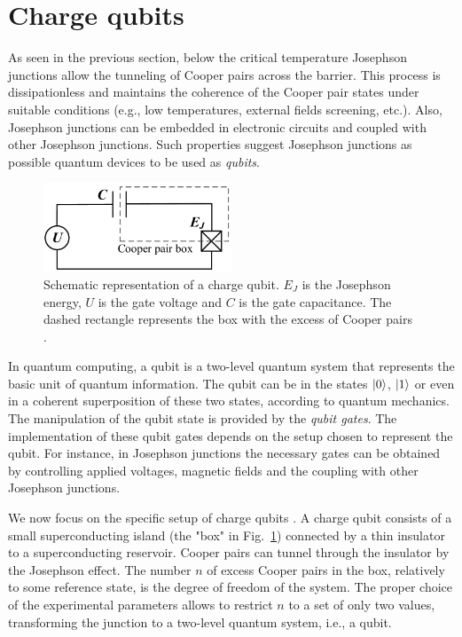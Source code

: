 \documentclass[../main/main.tex]{subfiles}
\begin{document}
\section{Charge qubits} \label{sect:charge_qubits}
As seen in the previous section, below the critical temperature Josephson junctions allow the tunneling of Cooper pairs across the barrier. This process is dissipationless and maintains the coherence of the Cooper pair states under suitable conditions (e.g., low temperatures, external fields screening, etc.). Also, Josephson junctions can be embedded in electronic circuits and coupled with other Josephson junctions. Such properties suggest Josephson junctions as possible quantum devices to be used as \textit{qubits}. \par
\begin{figure}[ht]
    \vspace{-0.1cm}
    \centering
    \includegraphics[width=0.5\textwidth]{../images/charge_qubit.png}
    \vspace{-0.2cm}
    \caption{Schematic representation of a charge qubit. $E_J$ is the Josephson energy, $U$ is the gate voltage and $C$ is the gate capacitance. The dashed rectangle represents the box with the excess of Cooper pairs \cite[Figure~2]{Wu_Nori_2012}.}
    \label{fig:charge_qubit}
\end{figure}
In quantum computing, a qubit is a two-level quantum system that represents the basic unit of quantum information. The qubit can be in the states $\ket{0}$, $\ket{1}$ or even in a coherent superposition of these two states, according to quantum mechanics. The manipulation of the qubit state is provided by the \textit{qubit gates}. The implementation of these qubit gates depends on the setup chosen to represent the qubit. For instance, in Josephson junctions the necessary gates can be obtained by controlling applied voltages, magnetic fields and the coupling with other Josephson junctions. \par
We now focus on the specific setup of charge qubits \cite{RevModPhys.73.357}. A charge qubit consists of a small superconducting island (the "box" in Fig.~\ref{fig:charge_qubit}) connected by a thin insulator to a superconducting reservoir. Cooper pairs can tunnel through the insulator by the Josephson effect. The number $n$ of excess Cooper pairs in the box, relatively to some reference state, is the degree of freedom of the system. The proper choice of the experimental parameters allows to restrict $n$ to a set of only two values, transforming the junction to a two-level quantum system, i.e., a qubit.\\
\end{document}

